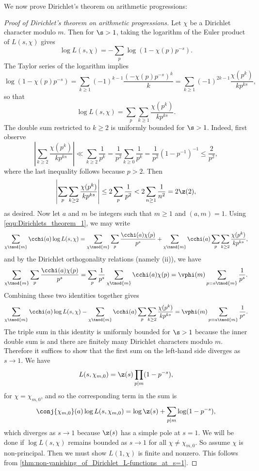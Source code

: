     We now prove Dirichlet's theorem on arithmetic progressions:

    \begin{proof}[Proof of Dirichlet's theorem on arithmetic progressions]
        Let \(\chi\) be a Dirichlet character modulo \(m\). Then for \(\s > 1\), taking the logarithm of the Euler product of \(L(s,\chi)\) gives
        \[
          \log{L(s,\chi)} = -\sum_{p}\log(1-\chi(p)p^{-s}).
        \]
        The Taylor series of the logarithm implies
        \[
          \log(1-\chi(p)p^{-s}) = \sum_{k \ge 1}(-1)^{k-1}\frac{(-\chi(p)p^{-s})^{k}}{k} = \sum_{k \ge 1}(-1)^{2k-1}\frac{\chi(p^{k})}{kp^{ks}},
        \]
        so that
        \begin{equation}\label{equ:Dirichlets_theorem_1}
          \log{L(s,\chi)} = \sum_{p}\sum_{k \ge 1}\frac{\chi(p^{k})}{kp^{ks}}.
        \end{equation}
        The double sum restricted to \(k \ge 2\) is uniformly bounded for \(\s > 1\). Indeed, first observe
        \[
          \left|\sum_{k \ge 2}\frac{\chi(p^{k})}{kp^{ks}}\right| \ll \sum_{k \ge 2}\frac{1}{p^{k}} = \frac{1}{p^{2}}\sum_{k \ge 0}\frac{1}{p^{k}} = \frac{1}{p^{2}}(1-p^{-1})^{-1} \le \frac{2}{p^{2}},
        \]
        where the last inequality follows because \(p > 2\). Then
        \[
          \left|\sum_{p}\sum_{k \ge 2}\frac{\chi(p^{k})}{kp^{ks}}\right| \le 2\sum_{p}\frac{1}{p^{2}} < 2\sum_{n \ge 1}\frac{1}{n^{2}} = 2\z(2),
        \]
        as desired. Now let \(a\) and \(m\) be integers such that \(m \ge 1\) and \((a,m) = 1\). Using \cref{equ:Dirichlets_theorem_1}, we may write
        \[
          \sum_{\chi \tmod{m}}\cchi(a)\log{L(s,\chi)} = \sum_{\chi \tmod{m}}\sum_{p}\frac{\cchi(a)\chi(p)}{p^{s}}+\sum_{\chi \tmod{m}}\cchi(a)\sum_{p}\sum_{k \ge 2}\frac{\chi(p^{k})}{kp^{ks}},
        \]
        and by the Dirichlet orthogonality relations (namely (ii)), we have
        \[
          \sum_{\chi \tmod{m}}\sum_{p}\frac{\cchi(a)\chi(p)}{p^{s}} = \sum_{p}\frac1{p^{s}}\sum_{\chi \tmod{m}}\cchi(a)\chi(p) = \vphi(m)\sum_{p \equiv{a} \tmod{m}}\frac{1}{p^{s}}.
        \]
        Combining these two identities together gives
        \[
          \sum_{\chi \tmod{m}}\cchi(a)\log{L(s,\chi)}-\sum_{\chi \tmod{m}}\cchi(a)\sum_{p}\sum_{k \ge 2}\frac{\chi(p^{k})}{kp^{ks}} = \vphi(m)\sum_{p \equiv{a} \tmod{m}}\frac{1}{p^{s}}.
        \]
        The triple sum in this identity is uniformly bounded for \(\s > 1\) because the inner double sum is and there are finitely many Dirichlet characters modulo \(m\). Therefore it suffices to show that the first sum on the left-hand side diverges as \(s \to 1\). We have
        \[
          L(s,\chi_{m,0}) = \z(s)\prod_{p \mid m}(1-p^{-s}),
        \]
        for \(\chi = \chi_{m,0}\), and so the corresponding term in the sum is
        \[
          \conj{\chi_{m,0}}(a)\log L(s,\chi_{m,0}) = \log\z(s)+\sum_{p \mid m}\log(1-p^{-s}),
        \]
        which diverges as \(s \to 1\) because \(\z(s)\) has a simple pole at \(s = 1\). We will be done if \(\log{L(s,\chi)}\) remains bounded as \(s \to 1\) for all \(\chi \neq \chi_{m,0}\). So assume \(\chi\) is non-principal. Then we must show \(L(1,\chi)\) is finite and nonzero. This follows from \cref{thm:non-vanishing_of_Dirichlet_L-functions_at_s=1}.
    \end{proof}

